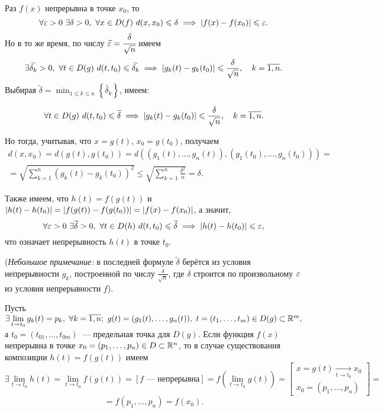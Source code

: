 \documentclass[../../main.tex]{subfiles}
\begin{document}
	\begin{eans}
		Раз $f(x)$ непрерывна в точке $x_0$, то
		\[
		\forall \varepsilon > 0\ \exists \delta > 0,\ \forall x\in D(f)\ d(x, x_0)\leqslant 
		\delta\implies \left|{f(x) - f(x_0)}\right|\leqslant \varepsilon.
		\]
		Но в то же время, по числу $\widetilde{\varepsilon} = \cfrac{\delta}{\sqrt{n}}$ 
		имеем
		\[\exists \widetilde{\delta_k} > 0,\ \forall t\in D(g)\ d(t, 
		t_0)\leqslant\widetilde{\delta_k}\implies \left|{g_k(t) - g_k(t_0)}\right|\leqslant 
		\frac{\delta}{\sqrt{n}},\quad k = \overline{1, n}.\]
		Выбирая $\widetilde{\delta} = \min_{1\leq k\leq 
		n}\left\{\widetilde{\delta_k}\right\}$, имеем:
		
		\[\forall t\in D(g)\ d(t, t_0)\leqslant\widetilde{\delta}\implies \left|{g_k(t) - 
		g_k(t_0)}\right|\leqslant \frac{\delta}{\sqrt{n}},\quad k = \overline{1, n}.\]
		
		Но тогда, учитывая, что $x = g(t)$, $x_0 = g(t_0)$, получаем
		\begin{gather*}
			d(x, x_0) = d(g(t), g(t_0)) = d\left((g_1(t),\ldots,g_n(t)), 
			(g_1(t_0),\ldots,g_n(t_0))\right) = \\
			= \sqrt{\sum_{k = 1}^n\left(g_k(t) - g_k(t_0)\right)^2}\leq \sqrt{\sum_{k = 
			1}^n\frac{\delta^2}{n}} = \delta.
		\end{gather*}
		
		Также имеем, что $h(t) = f(g(t))$ и $\left|{h(t) - h(t_0)}\right| = \left|{f(g(t)) - 
		f(g(t_0))}\right| = \left|{f(x) - f(x_0)}\right|$, а значит,
		\[\forall \varepsilon > 0\ \exists \widetilde{\delta} > 0,\ \forall t\in D(h)\ d(t, 
		t_0)\leqslant \widetilde{\delta}\implies \left|{h(t) - h(t_0)}\right|\leqslant \varepsilon,\]
		что означает непрерывность $h(t)$ в точке $t_0$.
		
		(\emph{Небольшое примечание:} в последней формуле $\widetilde{\delta}$ 
		берётся из условия непрерывности $g_k$, построенной по числу 
		$\frac{\delta}{\sqrt{n}}$, где $\delta$ строится по произвольному $\varepsilon$ из 
		условия непрерывности $f$).
	\end{eans}
    \begin{crl*}
    	Пусть $\exists \lim\limits_{t \to t_0}g_k(t) = p_k, \ 
    	\forall k = \overline{1, n}; \  g(t) = (g_1(t), 
    	\ldots, g_n(t)),\ t = (t_1,
    	 \ldots, t_m) \in D(g) \subset \R^m,$ а $t_0 = 
    	 (t_{01}, \ldots, t_{0m})$~---
    	предельная точка для $D(g)$. Если функция $f(x)$ непрерывна в точке 
    	$x_0 = (p_1, \ldots, p_n) \in D \subset \mathbb{R}^n$, то в случае 
    	существования композиции $h(t) = f(g(t))$ имеем
    	\[
    	    \exists \lim\limits_{t \to t_0}h(t) = \lim\limits_{t \to t_0}f(g(t)) =
    		\left[f\text{~--- непрерывна}\right] = f(\lim\limits_{t \to t_0}g(t)) = 
    		\left[
    		\begin{array}{l}
    			x = g(t) \underset{t \to t_0}{\to} x_0 \\
    			x_0 = (p_1, \ldots, p_n) 
    		\end{array}
    		\right] = 
    	\]
    	\[
    		= f(p_1, \ldots, p_n) = f(x_0).
    	\]
    \end{crl*}
\end{document}
